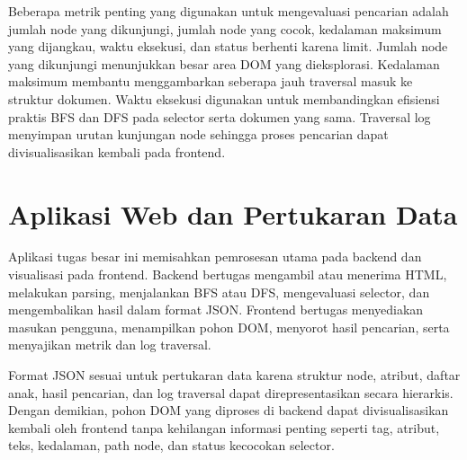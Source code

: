 Beberapa metrik penting yang digunakan untuk mengevaluasi pencarian adalah jumlah node yang dikunjungi, jumlah node yang cocok, kedalaman maksimum yang dijangkau, waktu eksekusi, dan status berhenti karena limit. Jumlah node yang dikunjungi menunjukkan besar area DOM yang dieksplorasi. Kedalaman maksimum membantu menggambarkan seberapa jauh traversal masuk ke struktur dokumen. Waktu eksekusi digunakan untuk membandingkan efisiensi praktis BFS dan DFS pada selector serta dokumen yang sama. Traversal log menyimpan urutan kunjungan node sehingga proses pencarian dapat divisualisasikan kembali pada frontend.

\section{Aplikasi Web dan Pertukaran Data}

Aplikasi tugas besar ini memisahkan pemrosesan utama pada backend dan visualisasi pada frontend. Backend bertugas mengambil atau menerima HTML, melakukan parsing, menjalankan BFS atau DFS, mengevaluasi selector, dan mengembalikan hasil dalam format JSON. Frontend bertugas menyediakan masukan pengguna, menampilkan pohon DOM, menyorot hasil pencarian, serta menyajikan metrik dan log traversal.

Format JSON sesuai untuk pertukaran data karena struktur node, atribut, daftar anak, hasil pencarian, dan log traversal dapat direpresentasikan secara hierarkis. Dengan demikian, pohon DOM yang diproses di backend dapat divisualisasikan kembali oleh frontend tanpa kehilangan informasi penting seperti tag, atribut, teks, kedalaman, path node, dan status kecocokan selector.
